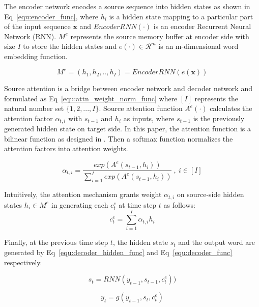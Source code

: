\documentclass[letterpaper]{article} %
\begin{document}
The encoder network encodes a source sequence into hidden states as shown in Eq~\eqref{equ:encoder_func},
 where $h_i$ is a hidden state mapping to a particular part of the input sequence $\textbf{x}$ and $EncoderRNN(\cdot)$ is an encoder Recurrent Neural Network (RNN). 
 $M^{e}$ represents the source memory buffer at encoder side with size $I$ to store the hidden states and $e(\cdot) \in \mathcal{R}^m $ is an m-dimensional word embedding function.

\begin{equation}
\label{equ:encoder_func}
M^{e}=(h_1,h_2,..,h_I)=EncoderRNN(e(\textbf{x}))
\end{equation}

Source attention is a bridge between encoder network and decoder network and formulated as Eq~\eqref{equ:attn_weight_norm_func} 
where $[I]$ represents the natural number set $\{1,2,...,I\}$. Source attention function $A^e(\cdot)$ calculates the attention factor $\alpha_{t,i}$ with $s_{t-1}$ and $h_i$ as inputs, where $s_{t-1}$ is the previously generated hidden state on target side. In this paper, the attention function is a bilinear function as designed in \cite{paulus2017deep}.
Then a softmax function normalizes the attention factors into attention weights. 

\begin{equation}
\label{equ:attn_weight_norm_func}
\alpha_{t,i}=\frac{exp(A^e(s_{t-1},h_{i}))}{\sum_{i=1}^I exp(A^e(s_{t-1},h_{i}))}\ ,\ i \in [I]
\end{equation}

Intuitively, the attention mechanism grants weight $\alpha_{t,i}$ on source-side hidden states $h_i \in M^{e}$ in generating each $c_t^e$ at time step $t$ as follows:
\begin{equation}
\label{equ:contex_vec}
c_t^e=\sum_{i=1}^I \alpha_{t,i}   h_i
\end{equation}

Finally, at the previous time step $t$, the hidden state $s_t$ and the output word are generated by Eq~\eqref{equ:decoder_hidden_func} and Eq~\eqref{equ:decoder_func} respectively. %

\begin{equation}
\label{equ:decoder_hidden_func}
s_t=RNN(y_{t-1},s_{t-1},c_t^e))
\end{equation}

\begin{equation}
\label{equ:decoder_func}
y_t=g(y_{t-1},s_t,c_t^e)
\end{equation}
\end{document}
